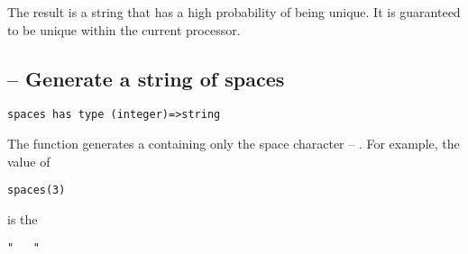 The result is a string that has a high probability of being unique. It is guaranteed to be unique within the current processor.

\subsection{ -- Generate a string of spaces}
\label{spaces}
\begin{lstlisting}
spaces has type (integer)=>string
\end{lstlisting}

The  function generates a  containing only the space character -- . For example, the value of
\begin{lstlisting}
spaces(3)
\end{lstlisting} 
is the 
\begin{lstlisting}
"   "
\end{lstlisting}
